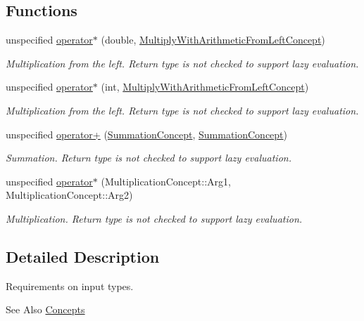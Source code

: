 \subsection*{Functions}
\begin{DoxyCompactItemize}
\item 
unspecified \hyperlink{group__ConceptGroup_ga10d0693d96a9ea69e9de1d10b0e4da1f}{operator$\ast$} (double, \hyperlink{structFunG_1_1Concepts_1_1MultiplyWithArithmeticFromLeftConcept}{Multiply\-With\-Arithmetic\-From\-Left\-Concept})
\begin{DoxyCompactList}\small\item\em Multiplication from the left. Return type is not checked to support lazy evaluation. \end{DoxyCompactList}\item 
unspecified \hyperlink{group__ConceptGroup_ga593fb8c43bd98b8eae6459f77874c7c7}{operator$\ast$} (int, \hyperlink{structFunG_1_1Concepts_1_1MultiplyWithArithmeticFromLeftConcept}{Multiply\-With\-Arithmetic\-From\-Left\-Concept})
\begin{DoxyCompactList}\small\item\em Multiplication from the left. Return type is not checked to support lazy evaluation. \end{DoxyCompactList}\item 
unspecified \hyperlink{group__ConceptGroup_gab9d1639ea6ed1088ec5bfbee24625f89}{operator+} (\hyperlink{structFunG_1_1Concepts_1_1SummationConcept}{Summation\-Concept}, \hyperlink{structFunG_1_1Concepts_1_1SummationConcept}{Summation\-Concept})
\begin{DoxyCompactList}\small\item\em Summation. Return type is not checked to support lazy evaluation. \end{DoxyCompactList}\item 
unspecified \hyperlink{group__ConceptGroup_ga02a0c88d20771819afda900e6bbf16f5}{operator$\ast$} (Multiplication\-Concept\-::\-Arg1, Multiplication\-Concept\-::\-Arg2)
\begin{DoxyCompactList}\small\item\em Multiplication. Return type is not checked to support lazy evaluation. \end{DoxyCompactList}\end{DoxyCompactItemize}


\subsection{Detailed Description}
Requirements on input types. \begin{DoxySeeAlso}{See Also}
\hyperlink{namespaceFunG_1_1Concepts}{Concepts} 
\end{DoxySeeAlso}
